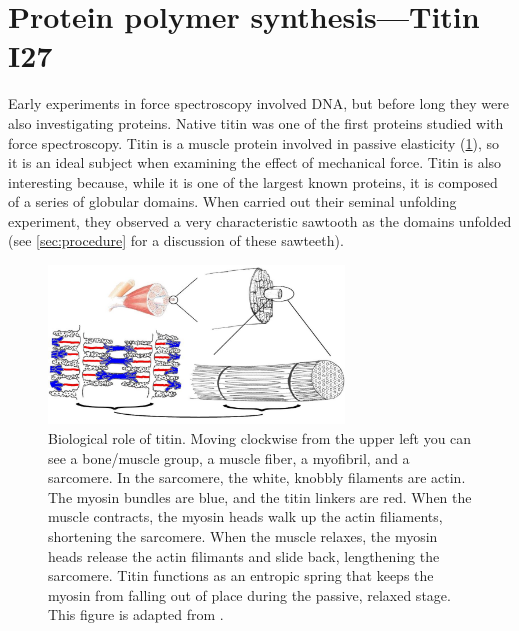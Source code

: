 \section{Protein polymer synthesis---Titin I27}
\label{sec:polymer-synthesis}

Early experiments in force spectroscopy involved
DNA\citep{bustamante94,florin95}, but before long they were also
investigating proteins.  Native titin was one of the first proteins
studied with force spectroscopy\citep{rief97a}.  Titin is
a muscle protein involved in passive elasticity
(\cref{fig:skeletal-muscle}), so it is an ideal subject when examining
the effect of mechanical force\citep{labeit95}.  Titin is also
interesting because, while it is one of the largest known proteins, it
is composed of a series of globular domains.  When \citet{rief97a}
carried out their seminal unfolding experiment, they observed a very
characteristic sawtooth as the domains unfolded (see
\cref{sec:procedure} for a discussion of these sawteeth).

\begin{figure}
  \includegraphics[width=0.7\textwidth]{figures/binary/skeletal_muscle}%
  \caption{Biological role of titin.  Moving clockwise
    from the upper left you can see a bone/muscle group, a muscle
    fiber, a myofibril, and a sarcomere.  In the sarcomere, the white,
    knobbly filaments are actin.  The myosin bundles are blue, and the
    titin linkers are red.  When the muscle contracts, the myosin
    heads walk up the actin filiaments, shortening the sarcomere.
    When the muscle relaxes, the myosin heads release the actin
    filimants and slide back, lengthening the sarcomere.  Titin
    functions as an entropic spring that keeps the myosin from falling
    out of place during the passive, relaxed stage.  This figure is
    adapted from \citet{skeletal_muscle}.\label{fig:skeletal-muscle}}
\end{figure}


